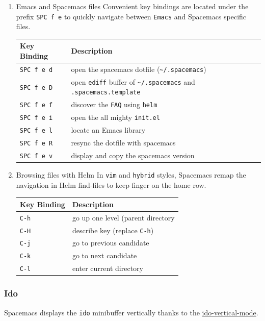 \documentclass[11pt]{article}
\begin{document}
\begin{enumerate}
\item Emacs and Spacemacs files
\label{sec:orgafcd6f1}
Convenient key bindings are located under the prefix \texttt{SPC f e} to quickly
navigate between \texttt{Emacs} and Spacemacs specific files.

\begin{center}
\begin{tabular}{ll}
Key Binding & Description\\
\hline
\texttt{SPC f e d} & open the spacemacs dotfile (\texttt{\textasciitilde{}/.spacemacs})\\
\texttt{SPC f e D} & open \texttt{ediff} buffer of \texttt{\textasciitilde{}/.spacemacs} and \texttt{.spacemacs.template}\\
\texttt{SPC f e f} & discover the \texttt{FAQ} using \texttt{helm}\\
\texttt{SPC f e i} & open the all mighty \texttt{init.el}\\
\texttt{SPC f e l} & locate an Emacs library\\
\texttt{SPC f e R} & resync the dotfile with spacemacs\\
\texttt{SPC f e v} & display and copy the spacemacs version\\
\end{tabular}
\end{center}

\item Browsing files with Helm
\label{sec:org298565f}
In \texttt{vim} and  \texttt{hybrid} styles, Spacemacs remap the navigation in Helm find-files
to keep finger on the home row.

\begin{center}
\begin{tabular}{ll}
Key Binding & Description\\
\hline
\texttt{C-h} & go up one level (parent directory\\
\texttt{C-H} & describe key (replace \texttt{C-h})\\
\texttt{C-j} & go to previous candidate\\
\texttt{C-k} & go to next candidate\\
\texttt{C-l} & enter current directory\\
\end{tabular}
\end{center}
\end{enumerate}

\subsubsection{Ido}
\label{sec:orgf8b72ca}
Spacemacs displays the \texttt{ido} minibuffer vertically thanks to the
\href{https://github.com/gempesaw/ido-vertical-mode.el}{ido-vertical-mode}.
\end{document}
